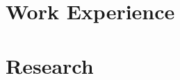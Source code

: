 \documentclass{article}
\begin{document}
\section*{Work Experience}

\section*{Research}
\end{document}
